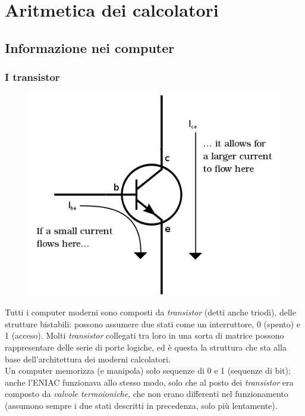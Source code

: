 \documentclass[class=book, crop=false]{standalone}
\begin{document}
\chapter{Aritmetica dei calcolatori}
\section{Informazione nei computer}

\subsection{I transistor}
\begin{figure}
	\includegraphics[width=0.9\linewidth]{transistor.png}
	\label{fig:transistor}
	\centering
\end{figure}
Tutti i computer moderni sono composti da \emph{transistor} (detti anche triodi), delle strutture bistabili: possono assumere due stati come un interruttore, 0 (spento) e 1 (acceso). Molti \emph{transistor} collegati tra loro in una sorta di matrice possono rappresentare delle serie di porte logiche, ed è questa la struttura che sta alla base dell'architettura dei moderni calcolatori.\\
Un computer memorizza (e manipola) solo sequenze di 0 e 1 (sequenze di bit); anche l’ENIAC funzionava allo stesso modo, solo che al posto dei \emph{transistor} era composto da \emph{valvole termoioniche}, che non erano differenti nel funzionamento (assumono sempre i due stati descritti in precedenza, solo più lentamente).
\end{document}
